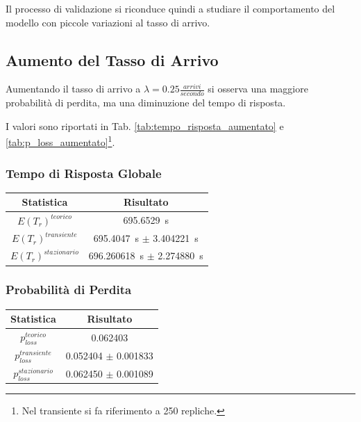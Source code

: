 \documentclass{article}
\begin{document}
Il processo di validazione si riconduce quindi a studiare il comportamento del modello con piccole variazioni al tasso di arrivo.

\subsection{Aumento del Tasso di Arrivo}

Aumentando il tasso di arrivo a $\lambda = 0.25 \frac{arrivi}{secondo}$ si osserva una maggiore probabilità di perdita, ma una diminuzione del tempo di risposta.  

I valori sono riportati in Tab. \ref{tab:tempo_risposta_aumentato} e \ref{tab:p_loss_aumentato}\footnote{Nel transiente si fa riferimento a 250 repliche.}.

\subsubsection{Tempo di Risposta Globale}

\begin{center}\label{tab:tempo_risposta_aumentato}
\begin{tabular}{|c|c|}
\hline
\textbf{Statistica} & \textbf{Risultato}\\
 \hline
\(E(T_{r})^{teorico}\) & 695.6529\ s \\
\hline
\(E(T_{r})^{transiente}\) & 695.4047\ s $\pm$ 3.404221\ s\\
\hline
\(E(T_{r})^{stazionario}\) & 696.260618\ s $\pm$ 2.274880\ s\\
 \hline
\end{tabular}
\end{center}

\subsubsection{Probabilità di Perdita}

\begin{center}\label{tab:p_loss_aumentato}
\begin{tabular}{|c|c|}
\hline
\textbf{Statistica} & \textbf{Risultato}\\
 \hline
\(p_{loss}^{teorico}\) & 0.062403 \\
\hline
\(p_{loss}^{transiente}\) & 0.052404 $\pm$ 0.001833 \\
\hline
\(p_{loss}^{stazionario}\) & 0.062450 $\pm$ 0.001089 \\
 \hline
\end{tabular}
\end{center}
\end{document}
